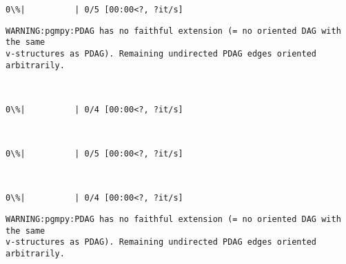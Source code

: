 \documentclass[11pt]{article}
\begin{document}
    
    \begin{Verbatim}[commandchars=\\\{\}]
  0\%|          | 0/5 [00:00<?, ?it/s]
    \end{Verbatim}

    
    \begin{Verbatim}[commandchars=\\\{\}]
WARNING:pgmpy:PDAG has no faithful extension (= no oriented DAG with the same
v-structures as PDAG). Remaining undirected PDAG edges oriented arbitrarily.
    \end{Verbatim}

    \begin{center}
    \end{center}
    { \hspace*{\fill} \\}
    
    
    \begin{Verbatim}[commandchars=\\\{\}]
  0\%|          | 0/4 [00:00<?, ?it/s]
    \end{Verbatim}

    
    \begin{center}
    \end{center}
    { \hspace*{\fill} \\}
    
    
    \begin{Verbatim}[commandchars=\\\{\}]
  0\%|          | 0/5 [00:00<?, ?it/s]
    \end{Verbatim}

    
    \begin{center}
    \end{center}
    { \hspace*{\fill} \\}
    
    
    \begin{Verbatim}[commandchars=\\\{\}]
  0\%|          | 0/4 [00:00<?, ?it/s]
    \end{Verbatim}

    
    \begin{Verbatim}[commandchars=\\\{\}]
WARNING:pgmpy:PDAG has no faithful extension (= no oriented DAG with the same
v-structures as PDAG). Remaining undirected PDAG edges oriented arbitrarily.
    \end{Verbatim}
\end{document}
